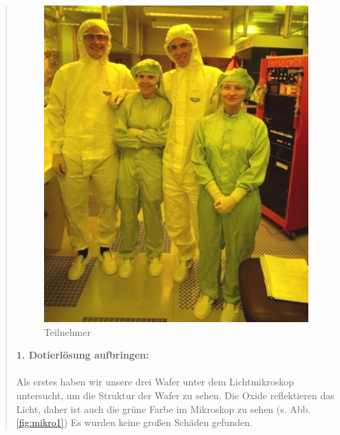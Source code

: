 \begin{quote}
            \begin{figure}[H]
				\hspace{4.8 cm}
                \includegraphics[scale=0.5, trim = 0cm 0cm 0cm 0cm,clip]
                	{./HerstellungBilder/Teilnehmer.png}
                  \caption{Teilnehmer}
                \label{fig:teiln}
            \end{figure}

    	\vspace{2em}

    	\textbf{1. Dotierlösung aufbringen:}\\
		\\
		Als erstes haben wir unsere drei Wafer unter dem Lichtmikroskop
		untersucht, um die Struktur der Wafer zu sehen. Die Oxide reflektieren 
		das Licht, daher ist auch die grüne Farbe im Mikroskop zu sehen
		(s. Abb. \ref{fig:mikro1}) Es wurden keine großen Schäden gefunden.

    	\vspace{2em}


\end{quote}
